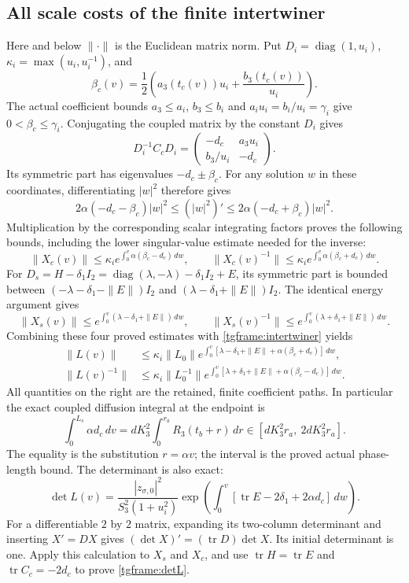 \subsection{All scale costs of the finite intertwiner}

Here and below $\|\cdot\|$ is the Euclidean matrix norm.
Put $D_i=\operatorname{diag}(1,u_i)$,
$\kappa_i=\max(u_i,u_i^{-1})$, and
\[
 \beta_c(v)=\frac12\left(a_3(t_c(v))u_i+
                                  \frac{b_3(t_c(v))}{u_i}\right).
\]
The actual coefficient bounds $a_3\le a_i$, $b_3\le b_i$ and
$a_iu_i=b_i/u_i=\gamma_i$ give $0<\beta_c\le\gamma_i$.
Conjugating the coupled matrix by the constant $D_i$ gives
\[
 D_i^{-1}C_cD_i=
 \begin{pmatrix}-d_c&a_3u_i\\b_3/u_i&-d_c\end{pmatrix}.
\]
Its symmetric part has eigenvalues $-d_c\pm\beta_c$.
For any solution $w$ in these coordinates, differentiating $|w|^2$
therefore gives
\[
 2\alpha(-d_c-\beta_c)|w|^2
 \le (|w|^2)'
 \le2\alpha(-d_c+\beta_c)|w|^2.
\]
Multiplication by the corresponding scalar integrating factors proves
the following bounds, including the lower singular-value estimate
needed for the inverse:
\[
 \|X_c(v)\|\le\kappa_i
       e^{\int_0^v\alpha(\beta_c-d_c)\,dw},\qquad
 \|X_c(v)^{-1}\|\le\kappa_i
       e^{\int_0^v\alpha(\beta_c+d_c)\,dw}.
\]
For $D_s=H-\delta_1I_2=
\operatorname{diag}(\lambda,-\lambda)-\delta_1I_2+E$,
its symmetric part is bounded between
$(-\lambda-\delta_1-\|E\|)I_2$ and
$(\lambda-\delta_1+\|E\|)I_2$. The identical energy argument gives
\[
 \|X_s(v)\|\le
 e^{\int_0^v(\lambda-\delta_1+\|E\|)\,dw},\qquad
 \|X_s(v)^{-1}\|\le
 e^{\int_0^v(\lambda+\delta_1+\|E\|)\,dw}.
\]
Combining these four proved estimates with \eqref{tgframe:intertwiner}
yields
\begin{align}
 \|L(v)\|&\le\kappa_i\|L_0\|
 e^{\int_0^v[\lambda-\delta_1+\|E\|
                       +\alpha(\beta_c+d_c)]\,dw},\nonumber\\
 \|L(v)^{-1}\|&\le\kappa_i\|L_0^{-1}\|
 e^{\int_0^v[\lambda+\delta_1+\|E\|
                       +\alpha(\beta_c-d_c)]\,dw}.
 \label{tgframe:intertwinernorms}
\end{align}
All quantities on the right are the retained, finite coefficient paths.
In particular the exact coupled diffusion integral at the endpoint is
\[
 \int_0^{L_s}\alpha d_c\,dv
 =dK_3^2\int_0^{r_a}R_3(t_b+r)\,dr
 \in[dK_3^2r_a,\ 2dK_3^2r_a].
\]
The equality is the substitution $r=\alpha v$; the interval is the
proved actual phase-length bound. The determinant is also exact:
\begin{equation}\label{tgframe:detL}
 \det L(v)=\frac{|z_{\sigma,0}|^2}{S_3^2(1+u_i^2)}
 \exp\left(\int_0^v[
        \operatorname{tr}E-2\delta_1+2\alpha d_c]\,dw\right).
\end{equation}
For a differentiable $2$ by $2$ matrix, expanding its two-column
determinant and inserting $X'=DX$ gives
$(\det X)'=(\operatorname{tr}D)\det X$. Its initial determinant
is one. Apply this calculation to $X_s$ and $X_c$, and use
$\operatorname{tr}H=\operatorname{tr}E$ and
$\operatorname{tr}C_c=-2d_c$ to prove \eqref{tgframe:detL}.

